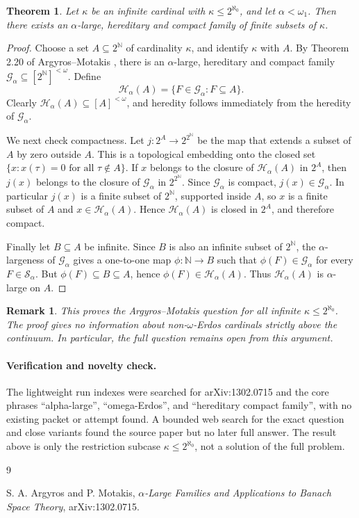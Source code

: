 \documentclass[11pt]{article}
\newtheorem{theorem}{Theorem}
\newtheorem{remark}{Remark}
\newcommand{\cont}{2^{\aleph_0}}
\begin{document}
\begin{theorem}
Let \(\kappa\) be an infinite cardinal with \(\kappa\leq \cont\), and let
\(\alpha<\omega_1\). Then there exists an \(\alpha\)-large, hereditary and
compact family of finite subsets of \(\kappa\).
\end{theorem}

\begin{proof}
Choose a set \(A\subseteq 2^{\mathbb N}\) of cardinality \(\kappa\), and
identify \(\kappa\) with \(A\). By Theorem 2.20 of Argyros--Motakis
\cite{AM}, there is an \(\alpha\)-large, hereditary and compact family
\(\mathcal G_\alpha\subseteq [2^{\mathbb N}]^{<\omega}\). Define
\[
  \mathcal H_\alpha(A)
  =
  \{F\in \mathcal G_\alpha : F\subseteq A\}.
\]
Clearly \(\mathcal H_\alpha(A)\subseteq [A]^{<\omega}\), and heredity follows
immediately from the heredity of \(\mathcal G_\alpha\).

We next check compactness. Let \(j:2^A\to 2^{2^{\mathbb N}}\) be the map that
extends a subset of \(A\) by zero outside \(A\). This is a topological
embedding onto the closed set \(\{x:x(\tau)=0\text{ for all }\tau\notin A\}\).
If \(x\) belongs to the closure of \(\mathcal H_\alpha(A)\) in \(2^A\), then
\(j(x)\) belongs to the closure of \(\mathcal G_\alpha\) in
\(2^{2^{\mathbb N}}\). Since \(\mathcal G_\alpha\) is compact, \(j(x)\in
\mathcal G_\alpha\). In particular \(j(x)\) is a finite subset of
\(2^{\mathbb N}\), supported inside \(A\), so \(x\) is a finite subset of
\(A\) and \(x\in\mathcal H_\alpha(A)\). Hence \(\mathcal H_\alpha(A)\) is
closed in \(2^A\), and therefore compact.

Finally let \(B\subseteq A\) be infinite. Since \(B\) is also an infinite
subset of \(2^{\mathbb N}\), the \(\alpha\)-largeness of \(\mathcal G_\alpha\)
gives a one-to-one map \(\phi:\mathbb N\to B\) such that
\(\phi(F)\in\mathcal G_\alpha\) for every \(F\in\mathcal S_\alpha\). But
\(\phi(F)\subseteq B\subseteq A\), hence \(\phi(F)\in\mathcal H_\alpha(A)\).
Thus \(\mathcal H_\alpha(A)\) is \(\alpha\)-large on \(A\).
\end{proof}

\begin{remark}
This proves the Argyros--Motakis question for all infinite
\(\kappa\leq 2^{\aleph_0}\). The proof gives no information about
non-\(\omega\)-Erdos cardinals strictly above the continuum. In particular,
the full question remains open from this argument.
\end{remark}

\paragraph{Verification and novelty check.}
The lightweight run indexes were searched for arXiv:1302.0715 and the core
phrases ``alpha-large'', ``omega-Erdos'', and ``hereditary compact family'',
with no existing packet or attempt found. A bounded web search for the exact
question and close variants found the source paper but no later full answer.
The result above is only the restriction subcase \(\kappa\leq\cont\), not a
solution of the full problem.

\begin{thebibliography}{9}

S. A. Argyros and P. Motakis,
\emph{\(\alpha\)-Large Families and Applications to Banach Space Theory},
arXiv:1302.0715.

\end{thebibliography}
\end{document}
